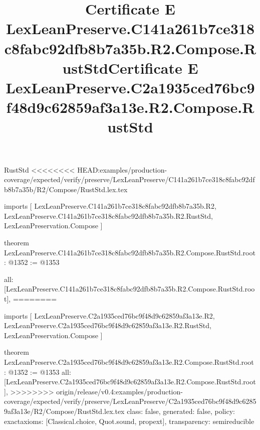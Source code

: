 \begin{lexlean}{RustStd}
<<<<<<<< HEAD:examples/production-coverage/expected/verify/preserve/LexLeanPreserve/C141a261b7ce318c8fabc92dfb8b7a35b/R2/Compose/RustStd.lex.tex
\title{Certificate E LexLeanPreserve.C141a261b7ce318c8fabc92dfb8b7a35b.R2.Compose.RustStd}
\begin{coremodule}
imports [
  LexLeanPreserve.C141a261b7ce318c8fabc92dfb8b7a35b.R2,
  LexLeanPreserve.C141a261b7ce318c8fabc92dfb8b7a35b.R2.RustStd,
  LexLeanPreservation.Compose
]

theorem LexLeanPreserve.C141a261b7ce318c8fabc92dfb8b7a35b.R2.Compose.RustStd.root : @1352 := @1353 {
  all: [LexLeanPreserve.C141a261b7ce318c8fabc92dfb8b7a35b.R2.Compose.RustStd.root],
========
\title{Certificate E LexLeanPreserve.C2a1935ced76bc9f48d9c62859af3a13e.R2.Compose.RustStd}
\begin{coremodule}
imports [
  LexLeanPreserve.C2a1935ced76bc9f48d9c62859af3a13e.R2,
  LexLeanPreserve.C2a1935ced76bc9f48d9c62859af3a13e.R2.RustStd,
  LexLeanPreservation.Compose
]

theorem LexLeanPreserve.C2a1935ced76bc9f48d9c62859af3a13e.R2.Compose.RustStd.root : @1352 := @1353 {
  all: [LexLeanPreserve.C2a1935ced76bc9f48d9c62859af3a13e.R2.Compose.RustStd.root],
>>>>>>>> origin/release/v0.4:examples/production-coverage/expected/verify/preserve/LexLeanPreserve/C2a1935ced76bc9f48d9c62859af3a13e/R2/Compose/RustStd.lex.tex
  class: false,
  generated: false,
  policy: exact{axioms: [Classical.choice, Quot.sound, propext]},
  transparency: semireducible
}


\end{coremodule}}
\end{coremodule}
\end{lexlean}
